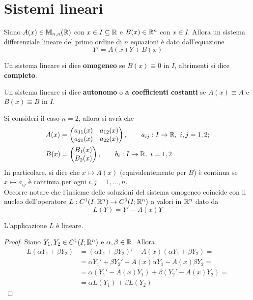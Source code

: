 \section{Sistemi lineari}
Siano $A(x) \in \mathbb{M}_{n,n}(\mathbb{R})$ con $x \in I \subseteq \mathbb{R}$ e $B(x) \in \mathbb{R}^n$ con $x \in I$. Allora un sistema differenziale lineare del primo ordine di $n$ equazioni è dato dall'equazione 
\begin{equation}
    Y'=A(x)Y+B(x)
\end{equation}
\begin{definition}
    Un sistema lineare si dice \textbf{omogeneo} se $B(x) \equiv 0$ in $I$, altrimenti si dice \textbf{completo}.
\end{definition}
\begin{definition}
    Un sistema lineare si dice \textbf{autonomo} o \textbf{a coefficienti costanti} se $A(x) \equiv A$ e $B(x) \equiv B$ in $I$.
\end{definition}
Si consideri il caso $n=2$, allora si avrà che
\begin{align}
    &A(x)=\begin{pmatrix}
        a_{11}(x) & a_{12}(x)\\
        a_{21}(x) & a_{22}(x)
    \end{pmatrix}, \qquad a_{ij}: I \to \mathbb{R},\ i, j=1,2;\\
    &B(x)=\begin{pmatrix}
        B_1(x)\\
        B_2(x)
    \end{pmatrix}, \qquad b_i:I \to \mathbb{R},\ i=1,2 
\end{align}
In particolare, si dice che $x \mapsto A(x)$ (equivalentemente per $B$) è continua se $x \mapsto a_{ij}$ è continua per ogni $i, j= 1, \dots, n$.\\
Occorre notare che l'insieme delle soluzioni del sistema omogeneo coincide con il nucleo dell'operatore $L:C^1(I; \mathbb{R}^n) \to C^0(I; \mathbb{R}^n)$ a valori in $\mathbb{R}^n$ dato da
    \begin{equation} \label{Eq: Applicazione L}
        L(Y)=Y'-A(x)Y
    \end{equation}
\begin{proposition}
    L'applicazione $L$
    è lineare.
\end{proposition}
\begin{proof}
    Siano $Y_1, Y_2 \in C^1(I; \mathbb{R}^n)$ e $\alpha, \beta \in \mathbb{R}$. Allora
    \begin{equation}
        \begin{aligned}
            L(\alpha Y_1 + \beta Y_2) &= (\alpha Y_1+ \beta Y_2)'- A(x)(\alpha Y_1 + \beta Y_2) =\\
            &= \alpha Y_1'+ \beta Y_2' - A(x) \alpha Y_1 - A(x) \beta Y_2=\\
            &=\alpha(Y_1'-A(x)Y_1)+ \beta (Y_2'-A(x)Y_2)=\\
            &=\alpha L(Y_1)+\beta L(Y_2)
        \end{aligned}
    \end{equation}
\end{proof}
